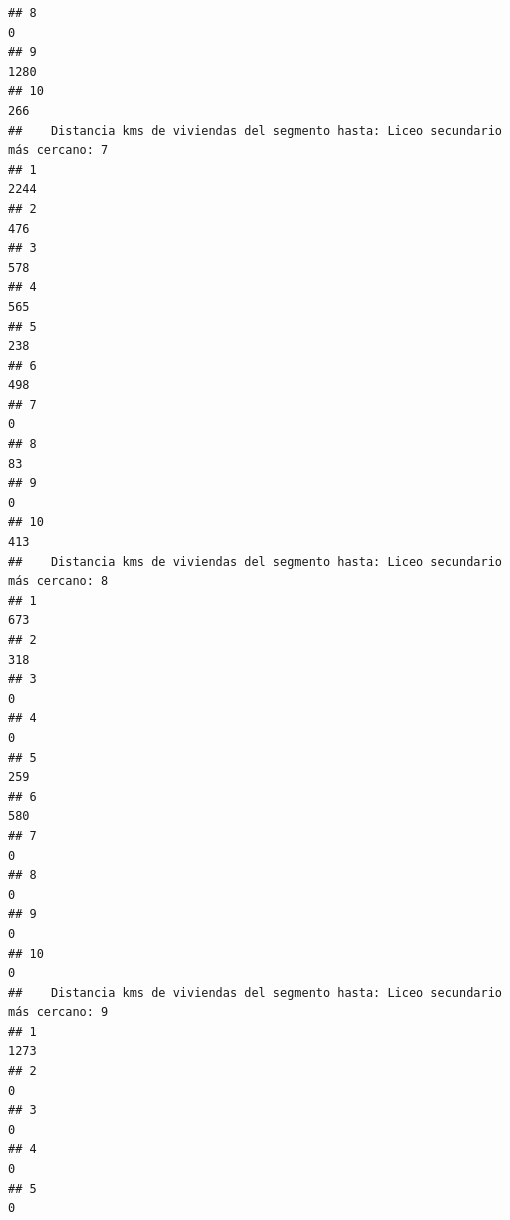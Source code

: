 \documentclass[11pt,]{article}
\begin{document}
\begin{verbatim}
## 8                                                                               0
## 9                                                                            1280
## 10                                                                            266
##    Distancia kms de viviendas del segmento hasta: Liceo secundario más cercano: 7
## 1                                                                            2244
## 2                                                                             476
## 3                                                                             578
## 4                                                                             565
## 5                                                                             238
## 6                                                                             498
## 7                                                                               0
## 8                                                                              83
## 9                                                                               0
## 10                                                                            413
##    Distancia kms de viviendas del segmento hasta: Liceo secundario más cercano: 8
## 1                                                                             673
## 2                                                                             318
## 3                                                                               0
## 4                                                                               0
## 5                                                                             259
## 6                                                                             580
## 7                                                                               0
## 8                                                                               0
## 9                                                                               0
## 10                                                                              0
##    Distancia kms de viviendas del segmento hasta: Liceo secundario más cercano: 9
## 1                                                                            1273
## 2                                                                               0
## 3                                                                               0
## 4                                                                               0
## 5                                                                               0

\end{verbatim}
\end{document}
